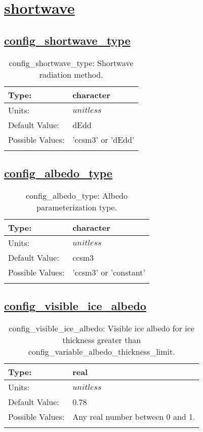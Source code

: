\section[shortwave]{\hyperref[sec:nm_tab_shortwave]{shortwave}}
\label{sec:nm_sec_shortwave}
\subsection[config\_shortwave\_type]{\hyperref[sec:nm_tab_shortwave]{config\_shortwave\_type}}
\label{subsec:nm_sec_config_shortwave_type}
\begin{center}
\begin{longtable}{| p{2.0in} || p{4.0in} |}
    \hline
    Type: & character \\
    \hline
    Units: & $unitless$ \\
    \hline
    Default Value: & dEdd \\
    \hline
    Possible Values: & 'ccsm3' or 'dEdd' \\
    \hline
    \caption{config\_shortwave\_type: Shortwave radiation method.}
\end{longtable}
\end{center}
\subsection[config\_albedo\_type]{\hyperref[sec:nm_tab_shortwave]{config\_albedo\_type}}
\label{subsec:nm_sec_config_albedo_type}
\begin{center}
\begin{longtable}{| p{2.0in} || p{4.0in} |}
    \hline
    Type: & character \\
    \hline
    Units: & $unitless$ \\
    \hline
    Default Value: & ccsm3 \\
    \hline
    Possible Values: & 'ccsm3' or 'constant' \\
    \hline
    \caption{config\_albedo\_type: Albedo parameterization type.}
\end{longtable}
\end{center}
\subsection[config\_visible\_ice\_albedo]{\hyperref[sec:nm_tab_shortwave]{config\_visible\_ice\_albedo}}
\label{subsec:nm_sec_config_visible_ice_albedo}
\begin{center}
\begin{longtable}{| p{2.0in} || p{4.0in} |}
    \hline
    Type: & real \\
    \hline
    Units: & $unitless$ \\
    \hline
    Default Value: & 0.78 \\
    \hline
    Possible Values: & Any real number between 0 and 1. \\
    \hline
    \caption{config\_visible\_ice\_albedo: Visible ice albedo for ice thickness greater than config\_variable\_albedo\_thickness\_limit.}
\end{longtable}
\end{center}
